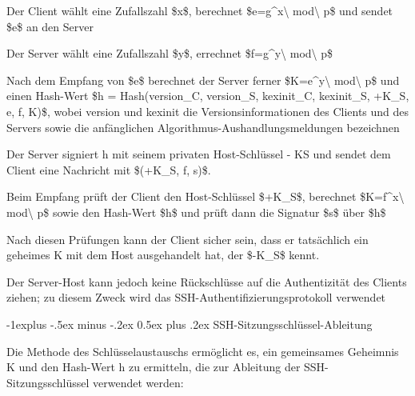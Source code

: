 \documentclass[a4paper]{article}
\makeatletter
\renewcommand{\subsection}{\@startsection{subsection}{2}{0mm}%
 {-1explus -.5ex minus -.2ex}%
 {0.5ex plus .2ex}%
 {\normalfont\normalsize\bfseries}}
\makeatother
\begin{document}
\begin{multicols}{3}
\begin{itemize*}
\begin{itemize*}
                  \begin{itemize*}
                        \item Der Client wählt eine Zufallszahl \$x\$, berechnet \$e=g\^{}x\textbackslash{} mod\textbackslash{} p\$ und sendet \$e\$ an den Server
                        \item Der Server wählt eine Zufallszahl \$y\$, errechnet \$f=g\^{}y\textbackslash{} mod\textbackslash{} p\$
                        \item Nach dem Empfang von \$e\$ berechnet der Server ferner \$K=e\^{}y\textbackslash{} mod\textbackslash{} p\$ und einen Hash-Wert \$h = Hash(version\_C, version\_S, kexinit\_C, kexinit\_S, +K\_S, e, f, K)\$, wobei version und kexinit die Versionsinformationen des Clients und des Servers sowie die anfänglichen Algorithmus-Aushandlungsmeldungen bezeichnen
                        \item Der Server signiert h mit seinem privaten Host-Schlüssel - KS und sendet dem Client eine Nachricht mit \$(+K\_S, f, s)\$.
                        \item Beim Empfang prüft der Client den Host-Schlüssel \$+K\_S\$, berechnet \$K=f\^{}x\textbackslash{} mod\textbackslash{} p\$ sowie den Hash-Wert \$h\$ und prüft dann die Signatur \$s\$ über \$h\$
                  \end{itemize*}
                  \item
                  Nach diesen Prüfungen kann der Client sicher sein, dass er tatsächlich
                  ein geheimes K mit dem Host ausgehandelt hat, der \$-K\_S\$ kennt.
                  \item
                  Der Server-Host kann jedoch keine Rückschlüsse auf die Authentizität
                  des Clients ziehen; zu diesem Zweck wird das
                  SSH-Authentifizierungsprotokoll verwendet
            \end{itemize*}


            \subsection{SSH-Sitzungsschlüssel-Ableitung}

            \begin{itemize*}
                  \item
                  Die Methode des Schlüsselaustauschs ermöglicht es, ein gemeinsames
                  Geheimnis K und den Hash-Wert h zu ermitteln, die zur Ableitung der
                  SSH-Sitzungsschlüssel verwendet werden:


\end{itemize*}
\end{itemize*}
\end{multicols}
\end{document}
